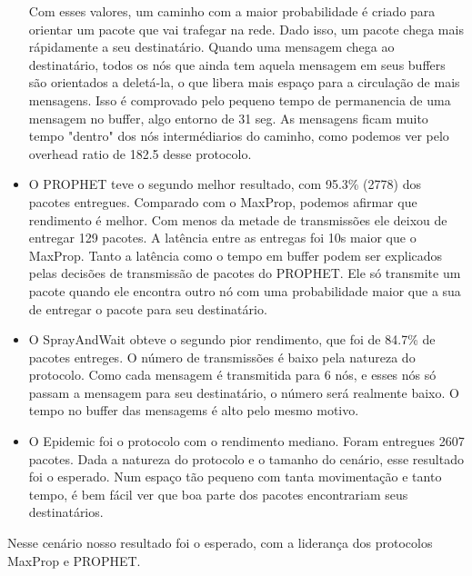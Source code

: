 \documentclass[conference]{IEEEtran}
\begin{document}
\begin{itemize}
			Com esses valores, um caminho com a maior probabilidade é criado para
			orientar um pacote que vai trafegar na rede. Dado isso, um pacote chega mais rápidamente a seu
			destinatário. Quando uma mensagem chega ao destinatário, todos os nós que ainda tem aquela mensagem
			em seus buffers são orientados a deletá-la, o que libera mais espaço para a circulação de mais 
			mensagens. Isso é comprovado pelo pequeno tempo de permanencia de uma mensagem no buffer, algo
			entorno de 31 seg. As mensagens ficam muito tempo "dentro" dos nós intermédiarios do caminho,
			como podemos ver pelo overhead ratio de 182.5 desse protocolo.
		\item O PROPHET teve o segundo melhor resultado, com 95.3\% (2778) dos pacotes entregues. Comparado
			com o MaxProp, podemos afirmar que rendimento é melhor. Com menos da metade de transmissões
			ele deixou de entregar 129 pacotes. A latência entre as entregas foi 10s maior que o MaxProp.
			Tanto a latência como o tempo em buffer podem ser explicados pelas decisões de transmissão
			de pacotes do PROPHET. Ele só transmite um pacote quando ele encontra outro nó com uma
			probabilidade maior que a sua de entregar o pacote para seu destinatário.
		\item O SprayAndWait obteve o segundo pior rendimento, que foi de 84.7\% de pacotes entreges. O número de 
			transmissões é baixo pela natureza do protocolo. Como cada mensagem é transmitida para 6 nós, e
			esses nós só passam a mensagem para seu destinatário, o número será realmente baixo. O tempo
			no buffer das mensagems é alto pelo mesmo motivo. 
		\item O Epidemic foi o protocolo com o rendimento mediano. Foram entregues 2607 pacotes. Dada a natureza do
			protocolo e o tamanho do cenário, esse resultado foi o esperado. Num espaço tão pequeno com tanta
			movimentação e tanto tempo, é bem fácil ver que boa parte dos pacotes encontrariam seus
			destinatários.
  \end{itemize}
			
  Nesse cenário nosso resultado foi o esperado, com a liderança dos protocolos MaxProp e PROPHET.
			
\end{document}
